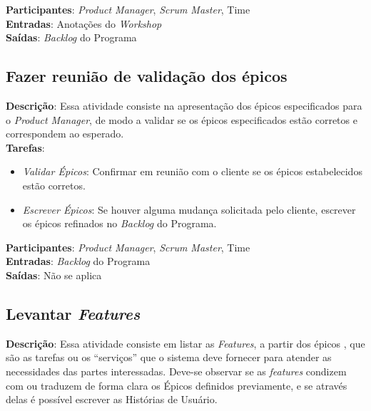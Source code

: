   \textbf{Participantes}: \textit{Product Manager}, \textit{Scrum Master}, Time \\

  \textbf{Entradas}: Anotações do \textit{Workshop} \\

  \textbf{Saídas}: \textit{Backlog} do Programa \\

\subsection{Fazer reunião de validação dos épicos}
  \textbf{Descrição}: Essa atividade consiste na apresentação dos épicos especificados para o \textit{Product Manager}, de modo a validar se os épicos
  especificados estão corretos e correspondem ao esperado. \\

  \textbf{Tarefas}:

  \begin{itemize}
    \item \indent \textit{Validar Épicos}: Confirmar em reunião com o cliente se os épicos estabelecidos estão corretos.

   \item \indent \textit{Escrever Épicos}: Se houver alguma mudança solicitada pelo cliente, escrever os épicos
   refinados no \textit{Backlog} do Programa.
  \end{itemize}

  \textbf{Participantes}: \textit{Product Manager}, \textit{Scrum Master}, Time \\

  \textbf{Entradas}: \textit{Backlog} do Programa \\

  \textbf{Saídas}:  Não se aplica\\

\subsection{Levantar \textit{Features}}
\textbf{Descrição}: Essa atividade consiste em listar as \textit{Features}, a partir dos épicos ,
que são as tarefas ou os “serviços” que o sistema deve fornecer para atender as necessidades das partes interessadas.
Deve-se observar se as \textit{features} condizem com ou traduzem de forma clara os Épicos
definidos previamente, e se através delas é possível escrever as Histórias de Usuário.\\

